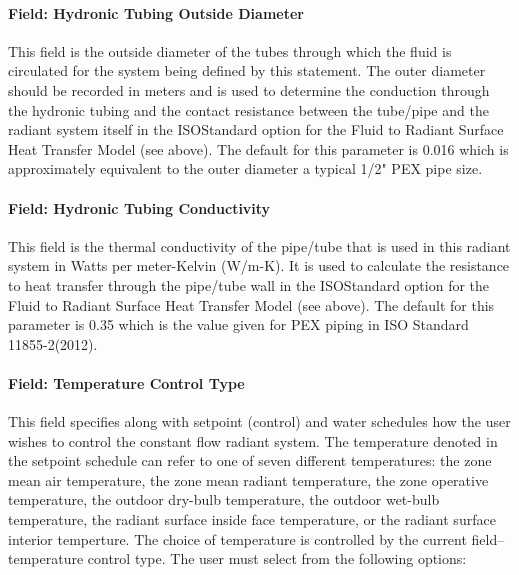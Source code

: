 \paragraph{Field: Hydronic Tubing Outside Diameter}\label{field-hydronic-tubing-outside-diameter-000}

This field is the outside diameter of the tubes through which the fluid is circulated for the system being defined by this statement. The outer diameter should be recorded in meters and is used to determine the conduction through the hydronic tubing and the contact resistance between the tube/pipe and the radiant system itself in the ISOStandard option for the Fluid to Radiant Surface Heat Transfer Model (see above).  The default for this parameter is 0.016 which is approximately equivalent to the outer diameter a typical 1/2" PEX pipe size.



\paragraph{Field: Hydronic Tubing Conductivity}\label{field-hydronic-tubing-conductivity-000}

This field is the thermal conductivity of the pipe/tube that is used in this radiant system in Watts per meter-Kelvin (W/m-K).  It is used to calculate the resistance to heat transfer through the pipe/tube wall in the ISOStandard option for the Fluid to Radiant Surface Heat Transfer Model (see above).  The default for this parameter is 0.35 which is the value given for PEX piping in ISO Standard 11855-2(2012).

\paragraph{Field: Temperature Control Type}\label{field-temperature-control-type}

This field specifies along with setpoint (control) and water schedules how the user wishes to control the constant flow radiant system. The temperature denoted in the setpoint schedule can refer to one of seven different temperatures: the zone mean air temperature, the zone mean radiant temperature, the zone operative temperature, the outdoor dry-bulb temperature, the outdoor wet-bulb temperature, the radiant surface inside face temperature, or the radiant surface interior temperture. The choice of temperature is controlled by the current field--temperature control type. The user must select from the following options:

